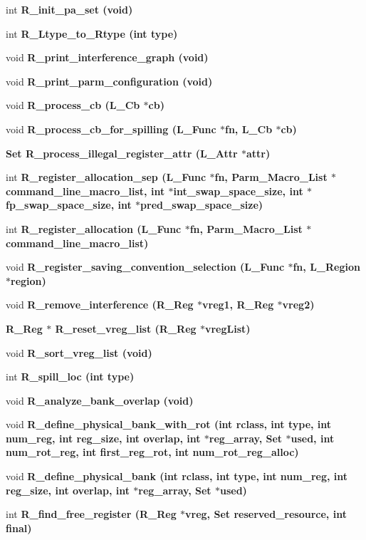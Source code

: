 \begin{CompactItemize}
\item 
int \bf{R\_\-init\_\-pa\_\-set} (void)
\item 
int \bf{R\_\-Ltype\_\-to\_\-Rtype} (int type)
\item 
void \bf{R\_\-print\_\-interference\_\-graph} (void)
\item 
void \bf{R\_\-print\_\-parm\_\-configuration} (void)
\item 
void \bf{R\_\-process\_\-cb} (L\_\-Cb $\ast$cb)
\item 
void \bf{R\_\-process\_\-cb\_\-for\_\-spilling} (L\_\-Func $\ast$fn, L\_\-Cb $\ast$cb)
\item 
\bf{Set} \bf{R\_\-process\_\-illegal\_\-register\_\-attr} (L\_\-Attr $\ast$attr)
\item 
int \bf{R\_\-register\_\-allocation\_\-sep} (L\_\-Func $\ast$fn, \bf{Parm\_\-Macro\_\-List} $\ast$command\_\-line\_\-macro\_\-list, int $\ast$int\_\-swap\_\-space\_\-size, int $\ast$fp\_\-swap\_\-space\_\-size, int $\ast$pred\_\-swap\_\-space\_\-size)
\item 
int \bf{R\_\-register\_\-allocation} (L\_\-Func $\ast$fn, \bf{Parm\_\-Macro\_\-List} $\ast$command\_\-line\_\-macro\_\-list)
\item 
void \bf{R\_\-register\_\-saving\_\-convention\_\-selection} (L\_\-Func $\ast$fn, L\_\-Region $\ast$\bf{region})
\item 
void \bf{R\_\-remove\_\-interference} (\bf{R\_\-Reg} $\ast$vreg1, \bf{R\_\-Reg} $\ast$vreg2)
\item 
\bf{R\_\-Reg} $\ast$ \bf{R\_\-reset\_\-vreg\_\-list} (\bf{R\_\-Reg} $\ast$vreg\-List)
\item 
void \bf{R\_\-sort\_\-vreg\_\-list} (void)
\item 
int \bf{R\_\-spill\_\-loc} (int type)
\item 
void \bf{R\_\-analyze\_\-bank\_\-overlap} (void)
\item 
void \bf{R\_\-define\_\-physical\_\-bank\_\-with\_\-rot} (int rclass, int type, int num\_\-reg, int reg\_\-size, int overlap, int $\ast$reg\_\-array, \bf{Set} $\ast$used, int num\_\-rot\_\-reg, int first\_\-reg\_\-rot, int num\_\-rot\_\-reg\_\-alloc)
\item 
void \bf{R\_\-define\_\-physical\_\-bank} (int rclass, int type, int num\_\-reg, int reg\_\-size, int overlap, int $\ast$reg\_\-array, \bf{Set} $\ast$used)
\item 
int \bf{R\_\-find\_\-free\_\-register} (\bf{R\_\-Reg} $\ast$vreg, \bf{Set} reserved\_\-resource, int final)
\item 

\end{CompactItemize}
